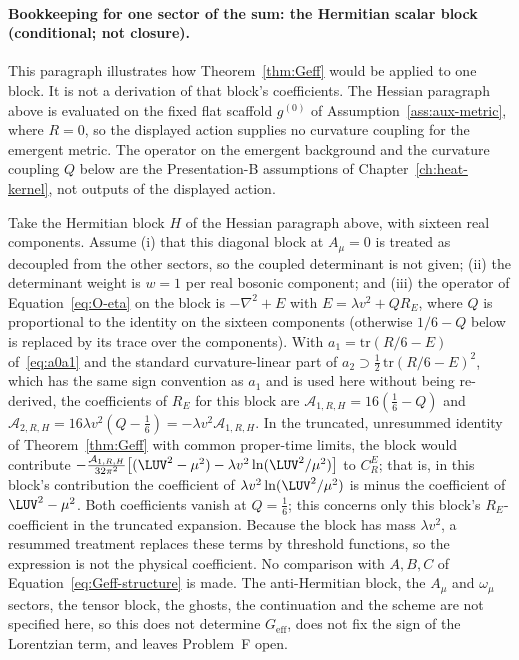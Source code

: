 \paragraph{Bookkeeping for one sector of the sum: the Hermitian scalar
block (conditional; not closure).}
This paragraph illustrates how Theorem~\ref{thm:Geff} would be applied
to one block.  It is not a derivation of that block's coefficients.
The Hessian paragraph above is evaluated on the fixed flat scaffold
\(g^{(0)}\) of Assumption~\ref{ass:aux-metric}, where \(R=0\), so the
displayed action supplies no curvature coupling for the emergent
metric.  The operator on the emergent background and the curvature
coupling \(Q\) below are the Presentation-B assumptions of
Chapter~\ref{ch:heat-kernel}, not outputs of the displayed action.

Take the Hermitian block \(H\) of the Hessian paragraph above, with sixteen real
components.  Assume (i) that this diagonal block at \(A_\mu=0\) is
treated as decoupled from the other sectors, so the coupled determinant
is not given; (ii) the determinant weight is \(w=1\) per real bosonic
component; and (iii) the operator of Equation~\eqref{eq:O-eta} on the
block is \(-\nabla^2+E\) with \(E=\lambda v^2+QR_E\), where \(Q\) is
proportional to the identity on the sixteen components (otherwise
\(1/6-Q\) below is replaced by its trace over the components).  With
\(a_1=\mathrm{tr}(R/6-E)\) of~\eqref{eq:a0a1} and the standard
curvature-linear part of
\(a_2\supset\tfrac12\,\mathrm{tr}(R/6-E)^2\), which has the same sign
convention as \(a_1\) and is used here without being re-derived, the
coefficients of \(R_E\) for this block are
\(\mathcal A_{1,R,H}=16(\tfrac16-Q)\) and
\(\mathcal A_{2,R,H}=16\lambda v^2(Q-\tfrac16)=-\lambda v^2\mathcal A_{1,R,H}\).
In the truncated, unresummed identity of Theorem~\ref{thm:Geff} with
common proper-time limits, the block would contribute
\(-\frac{\mathcal A_{1,R,H}}{32\pi^2}\bigl[(\LUV^2-\mu^2)
-\lambda v^2\ln(\LUV^2/\mu^2)\bigr]\) to \(C_R^E\); that is, in this
block's contribution the coefficient of \(\lambda v^2\ln(\LUV^2/\mu^2)\)
is minus the coefficient of \(\LUV^2-\mu^2\).  Both coefficients vanish
at \(Q=\tfrac16\); this concerns only this block's \(R_E\)-coefficient
in the truncated expansion.  Because the block has mass \(\lambda v^2\),
a resummed treatment replaces these terms by threshold functions, so
the expression is not the physical coefficient.  No comparison with
\(A,B,C\) of Equation~\eqref{eq:Geff-structure} is made.  The
anti-Hermitian block, the \(A_\mu\) and \(\omega_\mu\) sectors, the
tensor block, the ghosts, the continuation and the scheme are not
specified here, so this does not determine \(G_{\mathrm{eff}}\), does
not fix the sign of the Lorentzian term, and leaves Problem~F open.

